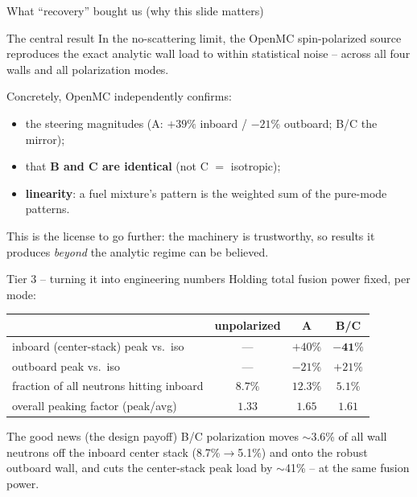 \documentclass[aspectratio=169]{beamer}
\newcommand{\keyword}[1]{\textcolor{blue!60!black}{\textbf{#1}}}
\begin{document}
\begin{frame}{What ``recovery'' bought us (why this slide matters)}
  \begin{block}{The central result}
    In the no-scattering limit, the OpenMC spin-polarized source \alert{reproduces the exact analytic wall load to within statistical noise} -- across all four walls and all polarization modes.
  \end{block}
  \vfill
  Concretely, OpenMC independently confirms:
  \begin{itemize}
    \item the steering magnitudes (A: $+39\%$ inboard / $-21\%$ outboard; B/C the mirror);
    \item that \keyword{B and C are identical} (not C $=$ isotropic);
    \item \keyword{linearity}: a fuel mixture's pattern is the weighted sum of the pure-mode patterns.
  \end{itemize}
  \vfill
  \alert{This is the license to go further:} the machinery is trustworthy, so results it produces \emph{beyond} the analytic regime can be believed.
\end{frame}

\begin{frame}{Tier 3 -- turning it into engineering numbers}
  Holding total fusion power fixed, per mode:
  \begin{center}\footnotesize
  \begin{tabular}{lccc}
    \toprule
     & unpolarized & A & B/C \\
    \midrule
    inboard (center-stack) peak vs.\ iso & --- & $+40\%$ & $\mathbf{-41\%}$ \\
    outboard peak vs.\ iso & --- & $-21\%$ & $+21\%$ \\
    fraction of all neutrons hitting inboard & $8.7\%$ & $12.3\%$ & $\mathbf{5.1\%}$ \\
    overall peaking factor (peak/avg) & $1.33$ & $1.65$ & $1.61$ \\
    \bottomrule
  \end{tabular}
  \end{center}
  \vfill
  \begin{block}{The good news (the design payoff)}
    B/C polarization \alert{moves $\sim$3.6\% of all wall neutrons off the inboard center stack} (8.7\%$\to$5.1\%) and onto the robust outboard wall, and cuts the center-stack peak load by $\sim$41\% -- at \alert{the same fusion power}.
  \end{block}
\end{frame}
\end{document}
